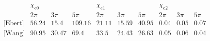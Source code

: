 $$
\begin{array}{c|ccc|ccc|ccc}
 \text{} & \chi _{\text{c0}} &  &  & \chi _{\text{c1}} &  &  & \chi _{\text{c2}} &  &  \\
 \text{} & \text{2$\pi $} & \text{3$\pi $} & \text{5$\pi $} & \text{2$\pi $} & \text{3$\pi $} & \text{5$\pi $} & \text{2$\pi $} & \text{3$\pi $} & \text{5$\pi $} \\
\hline
 \text{[Ebert]} & 56.24 & 15.4 & 109.16 & 21.11 & 15.59 & 40.95 & 0.04 & 0.05 & 0.07 \\
 \text{[Wang]} & 90.95 & 30.47 & 69.4 & 33.5 & 24.43 & 26.63 & 0.05 & 0.06 & 0.04 \\
\end{array}$$
